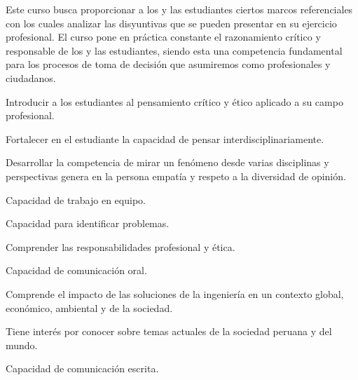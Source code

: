 \begin{syllabus}


\begin{justification}
Este curso busca proporcionar a los y las estudiantes ciertos marcos referenciales con los cuales analizar las disyuntivas que se pueden presentar en su ejercicio profesional. 
El curso pone en práctica constante el razonamiento crítico y responsable de los  y las estudiantes, siendo esta una competencia fundamental para los procesos de toma de decisión que asumiremos como profesionales y ciudadanos.
\end{justification}
\begin{goals}
\item Introducir a los estudiantes al pensamiento crítico y ético aplicado a su campo profesional.
\item Fortalecer en el estudiante la capacidad de pensar interdisciplinariamente.
\item Desarrollar la competencia de mirar un fenómeno desde varias disciplinas y perspectivas genera en la persona empatía y respeto a la diversidad de opinión.
\item Capacidad de trabajo en equipo.
\item Capacidad para identificar problemas.
\item Comprender las responsabilidades profesional y ética.
\item Capacidad de comunicación oral.
\item Comprende el impacto de las soluciones de la ingeniería en un contexto global, económico, ambiental y de la sociedad.
\item Tiene interés por conocer sobre temas actuales de la sociedad peruana y del mundo.
\item Capacidad de comunicación escrita.
\end{goals}

\begin{outcomes}
    \item {}
    \item {}
    \item {}
    \item {}
    \item {}
\end{outcomes}


\end{syllabus}
